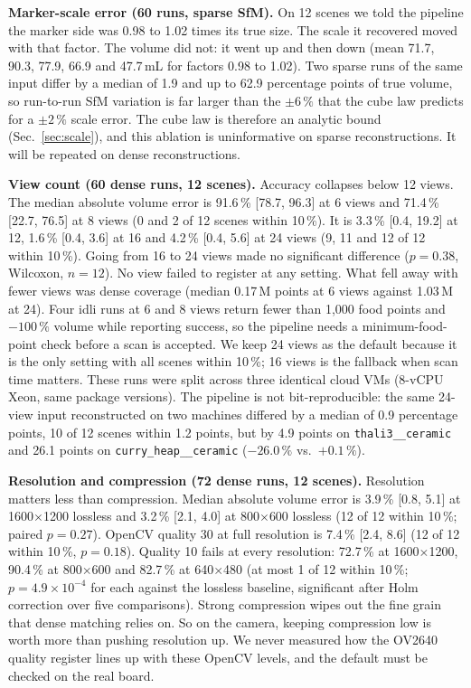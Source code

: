 \textbf{Marker-scale error (60 runs, sparse SfM).} On 12 scenes we told the
pipeline the marker side was 0.98 to 1.02 times its true size. The scale it
recovered moved with that factor. The volume did not: it went up and then down
(mean 71.7, 90.3, 77.9, 66.9 and 47.7\,mL for factors 0.98 to 1.02). Two sparse
runs of the same input differ by a median of 1.9 and up to 62.9 percentage
points of true volume, so run-to-run SfM variation is far larger than the
$\pm6\,\%$ that the cube law predicts for a $\pm2\,\%$ scale error. The cube law
is therefore an analytic bound (Sec.~\ref{sec:scale}), and this ablation is
uninformative on sparse reconstructions. It will be repeated on dense
reconstructions.

\textbf{View count (60 dense runs, 12 scenes).} Accuracy collapses below 12
views. The median absolute volume error is 91.6\,\% [78.7, 96.3] at 6 views
and 71.4\,\% [22.7, 76.5] at 8 views (0 and 2 of 12 scenes within 10\,\%). It
is 3.3\,\% [0.4, 19.2] at 12, 1.6\,\% [0.4, 3.6] at 16 and 4.2\,\% [0.4, 5.6]
at 24 views (9, 11 and 12 of 12 within 10\,\%). Going from 16 to 24
views made no significant difference ($p=0.38$, Wilcoxon, $n=12$). No view
failed to register at any setting. What fell away with fewer views was dense
coverage (median 0.17\,M points
at 6 views against 1.03\,M at 24). Four idli runs at 6 and 8 views return fewer
than 1{,}000 food points and $-100\,\%$ volume while reporting success, so the
pipeline needs a minimum-food-point check before a scan is accepted. We keep 24
views as the default because it is the only setting with all scenes within
10\,\%; 16 views is the fallback when scan time matters. These runs were split
across three identical cloud VMs (8-vCPU Xeon, same package versions). The
pipeline is not bit-reproducible: the same 24-view input reconstructed on two
machines differed by a median of 0.9 percentage points, 10 of 12 scenes within
1.2 points, but by 4.9 points on \texttt{thali3\_\_ceramic} and 26.1 points on
\texttt{curry\_heap\_\_ceramic} ($-26.0\,\%$ vs.\ $+0.1\,\%$).

\textbf{Resolution and compression (72 dense runs, 12 scenes).} Resolution
matters less than compression. Median absolute volume error is 3.9\,\% [0.8,
5.1] at 1600$\times$1200 lossless and 3.2\,\% [2.1, 4.0] at 800$\times$600
lossless (12 of 12 within 10\,\%; paired $p=0.27$). OpenCV quality 30 at full
resolution is 7.4\,\% [2.4, 8.6] (12 of 12 within 10\,\%, $p=0.18$). Quality 10
fails at every resolution: 72.7\,\% at 1600$\times$1200, 90.4\,\% at
800$\times$600 and 82.7\,\% at 640$\times$480 (at most 1 of 12 within 10\,\%;
$p=4.9\times10^{-4}$ for each against the lossless baseline, significant after
Holm correction over five comparisons). Strong compression wipes out the fine
grain that dense matching relies on. So on the camera, keeping compression low
is worth more than pushing resolution up. We never measured how the OV2640
quality register lines up with these OpenCV levels, and the default must be
checked on the real board.

